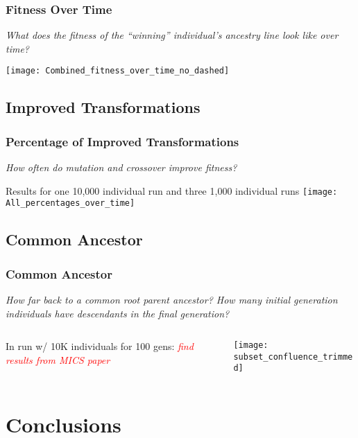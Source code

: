 \documentclass{beamer}
\begin{document}
\begin{frame}
\frametitle{Fitness Over Time}
\emph{What does the fitness of the ``winning'' individual's ancestry line look like over time?}
\begin{center}
\texttt{[image: Combined\_fitness\_over\_time\_no\_dashed]}
\end{center}
\end{frame}

\subsection[Improved Transformations]{Improved Transformations}

\begin{frame}
\frametitle{Percentage of Improved Transformations}
\emph{How often do mutation and crossover improve fitness?}
\begin{center}
{\tiny Results for one 10,000 individual run and three 1,000 individual runs}
\texttt{[image: All\_percentages\_over\_time]}
\end{center}
\end{frame}

\subsection[Common Ancestor]{Common Ancestor}

\begin{frame}
\frametitle{Common Ancestor}
\emph{How far back to a common root parent ancestor? How many initial generation individuals have descendants in the final generation?}
\begin{columns}
\begin{column}{0.55\textwidth}
In run w/ 10K individuals for 100 gens: \textcolor{red}{\emph{find results from MICS paper}}
\end{column}
\begin{column}{0.45\textwidth}
\begin{center}
\texttt{[image: subset\_confluence\_trimmed]}
\end{center}
\end{column}
\end{columns}
\end{frame}

\section[Conclusions]{Conclusions}
\end{document}
